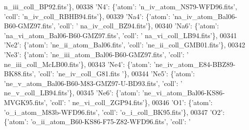 \begin{DoxyCode}
{      n\_iii\_coll\_BP92.fits'}\},
00338                              \textcolor{stringliteral}{'N4'}: \{\textcolor{stringliteral}{'atom'}: \textcolor{stringliteral}{'n\_iv\_atom\_NS79-WFD96.fits'}, \textcolor{stringliteral}{'coll'}: \textcolor{stringliteral}{'n\_iv\_coll\_RBHB94.fits'}\},
00339                              \textcolor{stringliteral}{'Na4'}: \{\textcolor{stringliteral}{'atom'}: \textcolor{stringliteral}{'na\_iv\_atom\_Bal06-B60-GMZ97.fits'}, \textcolor{stringliteral}{'coll'}: \textcolor{stringliteral}{'
      na\_iv\_coll\_BZ94.fits'}\},
00340                              \textcolor{stringliteral}{'Na6'}: \{\textcolor{stringliteral}{'atom'}: \textcolor{stringliteral}{'na\_vi\_atom\_Bal06-B60-GMZ97.fits'}, \textcolor{stringliteral}{'coll'}: \textcolor{stringliteral}{'
      na\_vi\_coll\_LB94.fits'}\},
00341                              \textcolor{stringliteral}{'Ne2'}: \{\textcolor{stringliteral}{'atom'}: \textcolor{stringliteral}{'ne\_ii\_atom\_Bal06.fits'}, \textcolor{stringliteral}{'coll'}: \textcolor{stringliteral}{'ne\_ii\_coll\_GMB01.fits'}\},
00342                              \textcolor{stringliteral}{'Ne3'}: \{\textcolor{stringliteral}{'atom'}: \textcolor{stringliteral}{'ne\_iii\_atom\_Bal06-B60-GMZ97.fits'}, \textcolor{stringliteral}{'coll'}: \textcolor{stringliteral}{'
      ne\_iii\_coll\_McLB00.fits'}\},
00343                              \textcolor{stringliteral}{'Ne4'}: \{\textcolor{stringliteral}{'atom'}: \textcolor{stringliteral}{'ne\_iv\_atom\_E84-BBZ89-BK88.fits'}, \textcolor{stringliteral}{'coll'}: \textcolor{stringliteral}{'ne\_iv\_coll\_G81.fits
      '}\},
00344                              \textcolor{stringliteral}{'Ne5'}: \{\textcolor{stringliteral}{'atom'}: \textcolor{stringliteral}{'ne\_v\_atom\_Bal06-B60-M83-GMZ97-U-BD93.fits'}, \textcolor{stringliteral}{'coll'}: \textcolor{stringliteral}{'
      ne\_v\_coll\_LB94.fits'}\},
00345                              \textcolor{stringliteral}{'Ne6'}: \{\textcolor{stringliteral}{'atom'}: \textcolor{stringliteral}{'ne\_vi\_atom\_Bal06-KS86-MVGK95.fits'}, \textcolor{stringliteral}{'coll'}: \textcolor{stringliteral}{'
      ne\_vi\_coll\_ZGP94.fits'}\},
00346                              \textcolor{stringliteral}{'O1'}: \{\textcolor{stringliteral}{'atom'}: \textcolor{stringliteral}{'o\_i\_atom\_M83b-WFD96.fits'}, \textcolor{stringliteral}{'coll'}: \textcolor{stringliteral}{'o\_i\_coll\_BK95.fits'}\},
00347                              \textcolor{stringliteral}{'O2'}: \{\textcolor{stringliteral}{'atom'}: \textcolor{stringliteral}{'o\_ii\_atom\_B60-KS86-F75-Z82-WFD96.fits'}, \textcolor{stringliteral}{'coll'}: \textcolor{stringliteral}{'
}
\end{DoxyCode}
